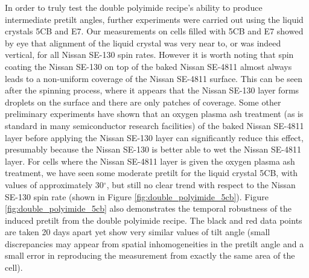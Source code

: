In order to truly test the double polyimide recipe's ability to produce intermediate pretilt angles, further experiments were carried out using the liquid crystals 5CB and E7. Our measurements on cells filled with 5CB and E7 showed by eye that alignment of the liquid crystal was very near to, or was indeed vertical, for all Nissan SE-130 spin rates. However it is worth noting that spin coating the Nissan SE-130 on top of the baked Nissan SE-4811 almost always leads to a non-uniform coverage of the Nissan SE-4811 surface. This can be seen after the spinning process, where it appears that the Nissan SE-130 layer forms droplets on the surface and there are only patches of coverage. Some other preliminary experiments have shown that an oxygen plasma ash treatment (as is standard in many semiconductor research facilities) of the baked Nissan SE-4811 layer before applying the Nissan SE-130 layer can significantly reduce this effect, presumably because the Nissan SE-130 is better able to wet the Nissan SE-4811 layer. For cells where the Nissan SE-4811 layer is given the oxygen plasma ash treatment, we have seen some moderate pretilt for the liquid crystal 5CB, with values of approximately 30$^{\circ}$, but still no clear trend with respect to the Nissan SE-130 spin rate (shown in Figure \ref{fig:double_polyimide_5cb}). Figure \ref{fig:double_polyimide_5cb} also demonstrates the temporal robustness of the induced pretilt from the double polyimide recipe. The black and red data points are taken 20 days apart yet show very similar values of tilt angle (small discrepancies may appear from spatial inhomogeneities in the pretilt angle and a small error in reproducing the measurement from exactly the same area of the cell). 


